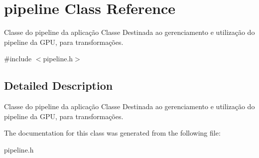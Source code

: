 \hypertarget{classpipeline}{\section{pipeline Class Reference}
\label{classpipeline}
}


Classe do pipeline da aplicação Classe Destinada ao gerenciamento e utilização do pipeline da G\-P\-U, para transformações.  




{\ttfamily \#include $<$pipeline.\-h$>$}



\subsection{Detailed Description}
Classe do pipeline da aplicação Classe Destinada ao gerenciamento e utilização do pipeline da G\-P\-U, para transformações. 

The documentation for this class was generated from the following file\-:\begin{DoxyCompactItemize}
\item 
pipeline.\-h\end{DoxyCompactItemize}
